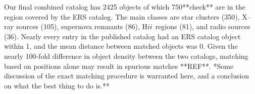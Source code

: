 Our final combined catalog has 2425 objects of which 750**check** are in the region covered by the ERS catalog.
The main classes are star clusters (350), X--ray sources (105), supernova remnants (86), H${\sc ii}$ regions (81),  and
radio sources (36).
Nearly every entry in the published catalog had an ERS catalog object within 1\arcsec, and the mean distance between
matched objects was 0.
Given the nearly 100-fold difference in object density between the two catalogs, matching based on positions alone may 
result in spurious matches **REF**. *Some discussion of the exact matching procedure is warranted here, and a conclusion
on what the best thing to do is.**




